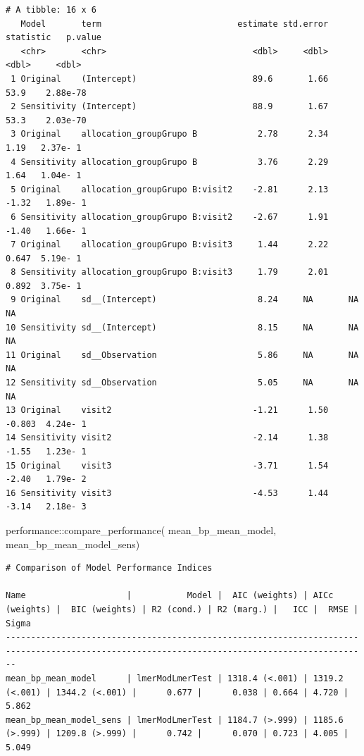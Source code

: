 \documentclass[
  12pt,
]{article}
\newenvironment{Shaded}{\begin{snugshade}}{\end{snugshade}}
\newcommand{\FunctionTok}[1]{\textcolor[rgb]{0.28,0.35,0.67}{#1}}
\newcommand{\NormalTok}[1]{\textcolor[rgb]{0.00,0.23,0.31}{#1}}
\newcommand{\SpecialCharTok}[1]{\textcolor[rgb]{0.37,0.37,0.37}{#1}}
\begin{document}
\begin{verbatim}
# A tibble: 16 x 6
   Model       term                           estimate std.error statistic   p.value
   <chr>       <chr>                             <dbl>     <dbl>     <dbl>     <dbl>
 1 Original    (Intercept)                       89.6       1.66    53.9    2.88e-78
 2 Sensitivity (Intercept)                       88.9       1.67    53.3    2.03e-70
 3 Original    allocation_groupGrupo B            2.78      2.34     1.19   2.37e- 1
 4 Sensitivity allocation_groupGrupo B            3.76      2.29     1.64   1.04e- 1
 5 Original    allocation_groupGrupo B:visit2    -2.81      2.13    -1.32   1.89e- 1
 6 Sensitivity allocation_groupGrupo B:visit2    -2.67      1.91    -1.40   1.66e- 1
 7 Original    allocation_groupGrupo B:visit3     1.44      2.22     0.647  5.19e- 1
 8 Sensitivity allocation_groupGrupo B:visit3     1.79      2.01     0.892  3.75e- 1
 9 Original    sd__(Intercept)                    8.24     NA       NA     NA       
10 Sensitivity sd__(Intercept)                    8.15     NA       NA     NA       
11 Original    sd__Observation                    5.86     NA       NA     NA       
12 Sensitivity sd__Observation                    5.05     NA       NA     NA       
13 Original    visit2                            -1.21      1.50    -0.803  4.24e- 1
14 Sensitivity visit2                            -2.14      1.38    -1.55   1.23e- 1
15 Original    visit3                            -3.71      1.54    -2.40   1.79e- 2
16 Sensitivity visit3                            -4.53      1.44    -3.14   2.18e- 3
\end{verbatim}

\begin{Shaded}
\begin{Highlighting}[]
\NormalTok{performance}\SpecialCharTok{::}\FunctionTok{compare\_performance}\NormalTok{(}
\NormalTok{    mean\_bp\_mean\_model, }
\NormalTok{    mean\_bp\_mean\_model\_sens) }
\end{Highlighting}
\end{Shaded}

\begin{verbatim}
# Comparison of Model Performance Indices

Name                    |           Model |  AIC (weights) | AICc (weights) |  BIC (weights) | R2 (cond.) | R2 (marg.) |   ICC |  RMSE | Sigma
----------------------------------------------------------------------------------------------------------------------------------------------
mean_bp_mean_model      | lmerModLmerTest | 1318.4 (<.001) | 1319.2 (<.001) | 1344.2 (<.001) |      0.677 |      0.038 | 0.664 | 4.720 | 5.862
mean_bp_mean_model_sens | lmerModLmerTest | 1184.7 (>.999) | 1185.6 (>.999) | 1209.8 (>.999) |      0.742 |      0.070 | 0.723 | 4.005 | 5.049
\end{verbatim}
\end{document}
